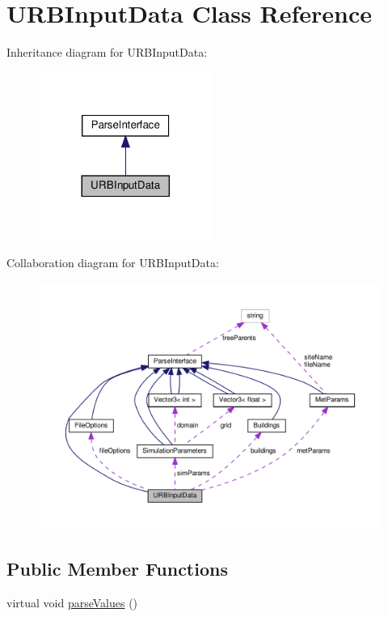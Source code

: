 \hypertarget{classURBInputData}{}\section{U\+R\+B\+Input\+Data Class Reference}
\label{classURBInputData}


Inheritance diagram for U\+R\+B\+Input\+Data\+:
\nopagebreak
\begin{figure}[H]
\begin{center}
\leavevmode
\includegraphics[width=161pt]{classURBInputData__inherit__graph}
\end{center}
\end{figure}


Collaboration diagram for U\+R\+B\+Input\+Data\+:
\nopagebreak
\begin{figure}[H]
\begin{center}
\leavevmode
\includegraphics[width=350pt]{classURBInputData__coll__graph}
\end{center}
\end{figure}
\subsection*{Public Member Functions}
\begin{DoxyCompactItemize}
\item 
virtual void \hyperlink{classURBInputData_a3fea38ec8d574eb8e5c9ee5f1ad53636}{parse\+Values} ()
\end{DoxyCompactItemize}

